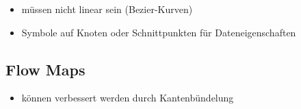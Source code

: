 \begin{itemize}
	\item müssen nicht linear sein (Bezier-Kurven)
	\item Symbole auf Knoten oder Schnittpunkten für Dateneigenschaften
\end{itemize}

\subsection{Flow Maps}

\begin{itemize}
	\item können verbessert werden durch Kantenbündelung
\end{itemize}